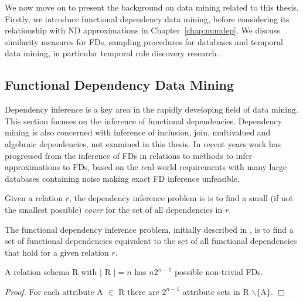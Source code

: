 We now move on to present the background on data mining related to
this thesis. Firstly, we introduce functional dependency data mining,
before considering its relationship with ND approximations in Chapter~\ref{chap:numdep}. We discuss similarity
measures for FDs, sampling procedures for databases and temporal data
mining, in particular temporal rule discovery research.


\subsection{Functional Dependency Data Mining}\label{subsec:fdmining}	

Dependency inference is a key area in the rapidly developing field of
data mining. This section focuses on the inference of functional dependencies. 
Dependency mining is also concerned with inference of inclusion, join,
multivalued and algebraic dependencies, not examined in 
this thesis. In recent years work has progressed from the inference of
FDs in relations to methods to infer approximations to FDs, based on
the real-world requirements with many large databases containing noise
making exact FD inference unfeasible.


\begin{definition}
\begin{rm}
Given a relation $r$,  the  dependency inference problem is is to 
find a small (if not the smallest possible) {\em cover} for the set of 
all dependencies in $r$.
\end{rm}
\end{definition}


The functional dependency inference problem,  initially described in
\cite{mr86}, is to find a set of functional dependencies equivalent to
the set of all functional dependencies that hold for a given relation
$r$.  

\begin{lemma}\label{rev:lem_fd_att}
\begin{rm}
A relation schema R with $\mid$ R $\mid = n$ has $n2^{n-1}$ possible
non-trivial FDs.
\end{rm}
\end{lemma}


{\em Proof.} For each attribute A $\in$ R there are $2^{n-1}$ attribute
sets in R $\backslash \{$A$\}$. $\Box$

